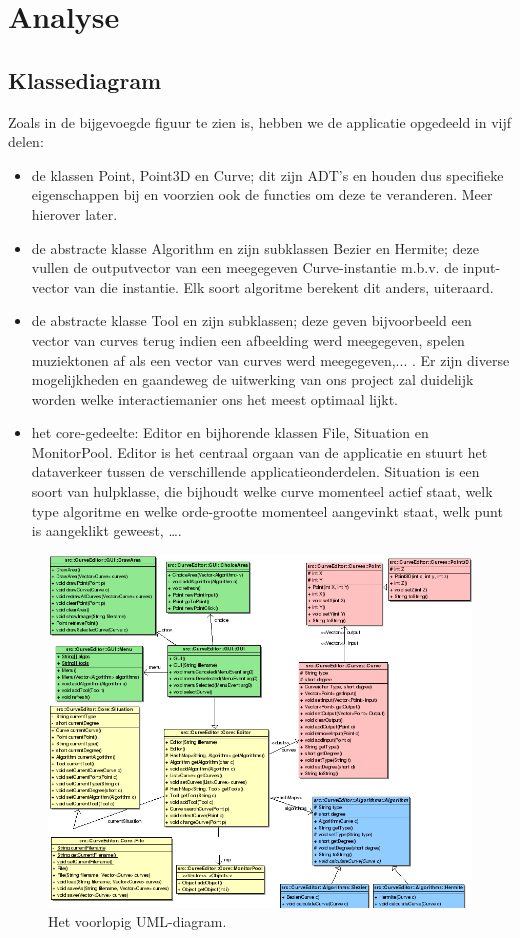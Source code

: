 \section{Analyse}
\subsection{Klassediagram}
Zoals in de bijgevoegde figuur te zien is, hebben we de applicatie opgedeeld in vijf delen:
	\begin{itemize}
		\item de klassen Point, Point3D en Curve; dit zijn ADT's en houden dus specifieke eigenschappen bij en voorzien ook de functies om deze te veranderen. Meer hierover later.
		\item de abstracte klasse Algorithm en zijn subklassen Bezier en Hermite; deze vullen de outputvector van een meegegeven Curve-instantie m.b.v. de input-vector van die instantie. Elk soort algoritme berekent dit anders, uiteraard.
		\item de abstracte klasse Tool en zijn subklassen; deze geven bijvoorbeeld een vector van curves terug indien een afbeelding werd meegegeven, spelen muziektonen af als een vector van curves werd meegegeven,... . Er zijn diverse mogelijkheden en gaandeweg de uitwerking van ons project zal duidelijk worden welke interactiemanier ons het meest optimaal lijkt.
		\item het core-gedeelte: Editor en bijhorende klassen File, Situation en MonitorPool. Editor is het centraal orgaan van de applicatie en stuurt het dataverkeer tussen de verschillende applicatieonderdelen. Situation is een soort van hulpklasse, die bijhoudt welke curve momenteel actief staat, welk type algoritme en welke orde-grootte momenteel aangevinkt staat, welk punt is aangeklikt geweest, \ldots.
 	\end{itemize}


\begin{figure}[hbp]
\center
\includegraphics[scale=0.65]{uml.png}
\caption{Het voorlopig UML-diagram.}
\end{figure}
\clearpage

 